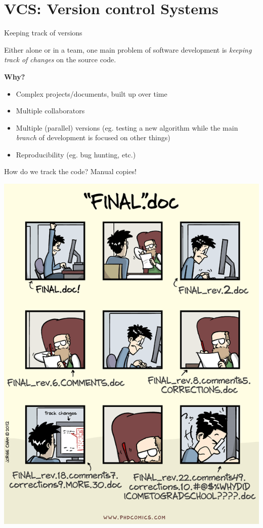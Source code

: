 
\section{VCS: Version control Systems}

\begin{frame}[fragile]{Keeping track of versions}

Either alone or in a team, one main problem of software development is \textit{keeping
track of changes} on the source code.

\vspace{1em}

\textbf{Why?}
\begin{itemize}
\item Complex projects/documents, built up over time
\item Multiple collaborators
\item Multiple (parallel) versions (eg. testing a new algorithm while the main
\textit{branch} of development is focused on other things)
\item Reproducibility (eg. bug hunting, etc.)
\end{itemize}
\end{frame}

\begin{frame}[fragile]{How do we track the code? Manual copies!}

\begin{center}
\includegraphics[height=0.89\textheight]{phd101212s}
\end{center}

\end{frame}

